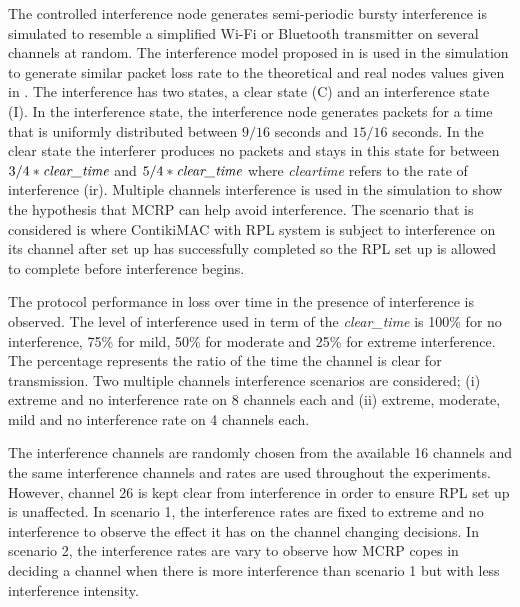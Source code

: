 
The controlled interference node generates semi-periodic bursty interference is simulated to resemble a simplified Wi-Fi or Bluetooth transmitter on several channels at random. The interference model proposed in \cite{interferenceModel} is used in the simulation to generate similar packet loss rate to the theoretical and real nodes values given in \cite{radio2009}. The interference has two states, a clear state (C) and an interference state (I). 
In the interference state, the interference node generates packets for a time that is uniformly distributed between $9/16$ seconds and $15/16$ seconds. In the clear state the interferer produces no packets and stays in this state for between $3/4 * \emph{clear\textunderscore time}$ and $5/4 * \emph{clear\textunderscore time}$ where \emph{clear\textunderscore time} refers to the rate of interference (ir). 
Multiple channels interference is used in the simulation to show the hypothesis that MCRP can help avoid interference. The scenario that is considered is where ContikiMAC with RPL system is subject to interference on its channel after set up has successfully completed so the RPL set up is allowed to complete before interference begins.

The protocol performance in loss over time in the presence of interference is observed. The level of interference used in term of the \textit{clear\_time} is 100\% for no interference, 75\% for mild, 50\% for moderate and 25\% for extreme interference. The percentage represents the ratio of the time the channel is clear for transmission.
Two multiple channels interference scenarios are considered; (i) extreme and no interference rate on 8 channels each and (ii) extreme, moderate, mild and no interference rate on 4 channels each.

The interference channels are randomly chosen from the available 16 channels and the same interference channels and rates are used throughout the experiments. However, channel 26 is kept clear from interference in order to ensure RPL set up is unaffected. In scenario 1, the interference rates are fixed to extreme and no interference to observe the effect it has on the channel changing decisions. In scenario 2, the interference rates are vary to observe how MCRP copes in deciding a channel when there is more interference than scenario 1 but with less interference intensity. 


